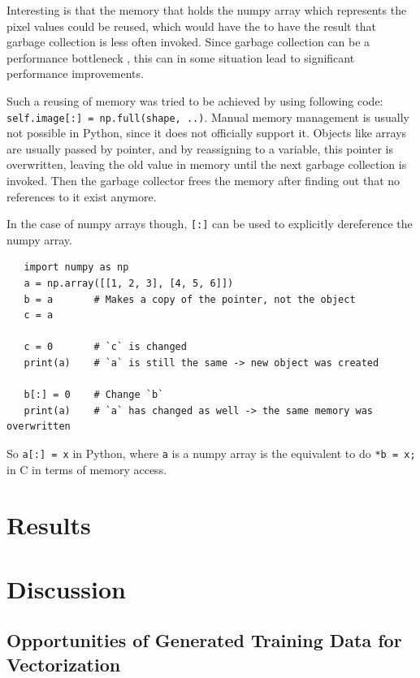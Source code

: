 \documentclass[12pt, a4paper, titlepage]{report}
\begin{document}
Interesting is that the memory that holds the numpy array which represents the pixel values could be reused, which would have the to have the result that garbage collection is less often invoked. Since garbage collection can be a performance bottleneck      %
, this can in some situation lead to significant performance improvements.      %

Such a reusing of memory was tried to be achieved by using following code: \lstinline{self.image[:] = np.full(shape, ..)}. Manual memory management is usually not possible in Python, since it does not officially support it. Objects like arrays are usually passed by pointer, and by reassigning to a variable, this pointer is overwritten, leaving the old value in memory until the next garbage collection is invoked. Then the garbage collector frees the memory after finding out that no references to it exist anymore.      %

In the case of numpy arrays though, \lstinline{[:]} can be used to explicitly dereference the numpy array.

\begin{lstlisting}
   import numpy as np
   a = np.array([[1, 2, 3], [4, 5, 6]])
   b = a       # Makes a copy of the pointer, not the object
   c = a

   c = 0       # `c` is changed
   print(a)    # `a` is still the same -> new object was created

   b[:] = 0    # Change `b`
   print(a)    # `a` has changed as well -> the same memory was overwritten
\end{lstlisting}

So \lstinline{a[:] = x} in Python, where \lstinline{a} is a numpy array is the equivalent to do \lstinline{*b = x;} in C in terms of memory access.




\chapter{Results}


\chapter{Discussion}

\section{Opportunities of Generated Training Data for Vectorization}
\end{document}
